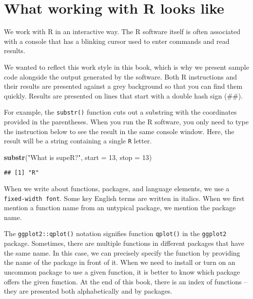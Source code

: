 \documentclass[]{book}
\newenvironment{Shaded}{\begin{snugshade}}{\end{snugshade}}
\newcommand{\KeywordTok}[1]{\textcolor[rgb]{0.13,0.29,0.53}{\textbf{#1}}}
\newcommand{\DataTypeTok}[1]{\textcolor[rgb]{0.13,0.29,0.53}{#1}}
\newcommand{\DecValTok}[1]{\textcolor[rgb]{0.00,0.00,0.81}{#1}}
\newcommand{\StringTok}[1]{\textcolor[rgb]{0.31,0.60,0.02}{#1}}
\newcommand{\NormalTok}[1]{#1}
\theoremstyle{definition}
\theoremstyle{definition}
\theoremstyle{definition}
\theoremstyle{remark}
\begin{document}
\section{What working with R looks like}\label{part1_2}

We work with R in an interactive way. The R software itself is often
associated with a console that has a blinking cursor used to enter
commands and read results.

We wanted to reflect this work style in this book, which is why we
present sample code alongside the output generated by the software. Both
R instructions and their results are presented against a grey background
so that you can find them quickly. Results are presented on lines that
start with a double hash sign (\#\#).

For example, the \texttt{substr()} function cuts out a substring with
the coordinates provided in the parentheses. When you run the R
software, you only need to type the instruction below to see the result
in the same console window. Here, the result will be a string containing
a single \texttt{R} letter.

\begin{Shaded}
\begin{Highlighting}[]
\KeywordTok{substr}\NormalTok{(}\StringTok{"What is supeR?"}\NormalTok{, }\DataTypeTok{start =} \DecValTok{13}\NormalTok{, }\DataTypeTok{stop =} \DecValTok{13}\NormalTok{)}
\end{Highlighting}
\end{Shaded}

\begin{verbatim}
## [1] "R"
\end{verbatim}

When we write about functions, packages, and language elements, we use a
\texttt{fixed-width\ font}. Some key English terms are written in
italics. When we first mention a function name from an untypical
package, we mention the package name.

The \texttt{ggplot2::qplot()} notation signifies function
\texttt{qplot()} in the \texttt{ggplot2} package. Sometimes, there are
multiple functions in different packages that have the same name. In
this case, we can precisely specify the function by providing the name
of the package in front of it. When we need to install or turn on an
uncommon package to use a given function, it is better to know which
package offers the given function. At the end of this book, there is an
index of functions -- they are presented both alphabetically and by
packages.
\end{document}
